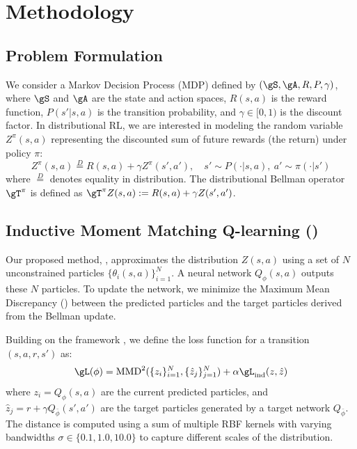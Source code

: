 \section{Methodology}

\subsection{Problem Formulation}
We consider a Markov Decision Process (MDP) defined by $(\gS, \gA, R, P, \gamma)$, where $\gS$ and $\gA$ are the state and action spaces, $R(s, a)$ is the reward function, $P(s'|s, a)$ is the transition probability, and $\gamma \in [0, 1)$ is the discount factor. In distributional RL, we are interested in modeling the random variable $Z^\pi(s, a)$ representing the discounted sum of future rewards (the return) under policy $\pi$:
\begin{equation}
Z^\pi(s, a) \stackrel{D}{=} R(s, a) + \gamma Z^\pi(s', a'), \quad s' \sim P(\cdot|s, a), \ a' \sim \pi(\cdot|s')
\end{equation}
where $\stackrel{D}{=}$ denotes equality in distribution. The distributional Bellman operator $\gT^\pi$ is defined as $\gT^\pi Z(s, a) := R(s, a) + \gamma Z(s', a')$.

\subsection{Inductive Moment Matching Q-learning (\immq)}
Our proposed method, \immq, approximates the distribution $Z(s, a)$ using a set of $N$ unconstrained particles $\{\theta_i(s, a)\}_{i=1}^N$. A neural network $Q_\phi(s, a)$ outputs these $N$ particles. To update the network, we minimize the Maximum Mean Discrepancy (\mmd) between the predicted particles and the target particles derived from the Bellman update.

 Building on the \imm framework \cite{zhou2025inductive}, we define the loss function for a transition $(s, a, r, s')$ as:
\begin{equation}
\gL(\phi) = \text{MMD}^2(\{z_i\}_{i=1}^N, \{\hat{z}_j\}_{j=1}^N) + \alpha \gL_{\text{ind}}(z, \hat{z})
\end{equation}
where $z_i = Q_\phi(s, a)$ are the current predicted particles, and $\hat{z}_j = r + \gamma Q_{\bar{\phi}}(s', a')$ are the target particles generated by a target network $Q_{\bar{\phi}}$. The \mmd distance is computed using a sum of multiple RBF kernels with varying bandwidths $\sigma \in \{0.1, 1.0, 10.0\}$ to capture different scales of the distribution.

